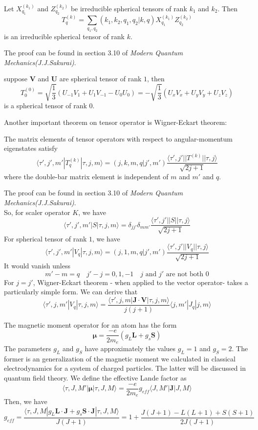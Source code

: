 \begin{newthem}
Let $X^{(k_1)}_{q_1}$ and $Z^{(k_2)}_{q_2}$ be irreducible spherical tensors of rank $k_1$ and $k_2$. Then
\[T^{(k)}_{q} = \sum_{q_1,q_2} (k_1,k_2,q_1,q_2|k,q) X^{(k_1)}_{q_1} Z^{(k_2)}_{q_2}\]
is an irreducible spherical tensor of rank $k$. 
\end{newthem}
\noindent
The proof can be found in section 3.10 of \emph{Modern Quantum Mechanics(J.J.Sakurai)}.

\begin{example}
suppose $\bm{V}$ and $\bm{U}$ are spherical tensor of rank $1$, then
\[T^{(0)}_{0} = \sqrt{\frac{1}{3}} (U_{-1}V_{1} + U_{1}V_{-1}-U_{0}U_{0}) = - \sqrt{\frac{1}{3}} (U_xV_x + U_yV_y + U_zV_z)\]
is a spherical tensor of rank $0$.
\end{example}

\noindent
Another important theorem on tensor operator is Wigner-Eckart theorem:\\

\begin{newthem}
The matrix elements of tensor operators with respect to angular-momentum eigenstates satisfy
\[\langle \tau',j',m'| T^{(k)}_{q}| \tau,j,m\rangle = (j,k,m,q|j',m') \frac{\langle \tau',j' || T^{(k)} || \tau,j\rangle}{\sqrt{2j+1}}\]
where the double-bar matrix element is independent of $m$ and $m'$ and $q$.
\end{newthem}

\noindent
The proof can be found in section 3.10 of \emph{Modern Quantum Mechanics(J.J.Sakurai)}.\\
So, for scaler operator $K$, we have
\[\langle \tau',j',m'| S| \tau,j,m\rangle = \delta_{jj'}\delta_{mm'} \frac{\langle \tau',j' || S || \tau,j\rangle}{\sqrt{2j+1}}\]
For spherical tensor of rank $1$, we have
\[\langle \tau',j',m'| V_{q} | \tau,j,m\rangle = (j,1,m,q|j',m') \frac{\langle \tau',j' || V_q || \tau,j\rangle}{\sqrt{2j+1}}\]
It would vanish unless
\[m'-m = q \quad j'-j = 0,1,-1 \quad j \mbox{ and } j' \mbox{ are not both  } 0\]
For $j=j'$, Wigner-Eckart theorem - when applied to the vector operator- takes a particularly simple form. We can derive that
\[\langle \tau',j,m' | V_q | \tau, j ,m \rangle = \frac{\langle \tau',j,m | \bm{J}\cdot\bm{V} | \tau, j ,m \rangle}{j(j+1)} \langle j,m' | J_q | j ,m \rangle\]

\begin{example}
The magnetic moment operator for an atom has the form
\[\bm{\mu} = \frac{-e}{2m_e } (g_L\bm{L} + g_s \bm{S})\]
The parameters $g_L$ and $g_S$ have approximately the
values $g_L = 1$ and $g_S = 2$. The former is an generalization of the magnetic moment we calculated in classical electrodynamics for a system of charged particles. The latter will be discussed in quantum field theory.
We define the effective Lande factor as
\[\langle \tau,J,M' | \bm{\mu} | \tau,J,M \rangle = \frac{-e}{2m_e } g_{eff} \langle J,M' | \bm{J} | J,M \rangle\]
Then, we have
\[g_{eff} = \frac{\langle \tau,J,M | g_L\bm{L}\cdot\bm{J} + g_s \bm{S}\cdot\bm{J} | \tau,J,M \rangle}{J(J+1)} = 1 + \frac{J(J+1)- L(L+1) + S(S+1)}{2J(J+1)}\]
\end{example}

